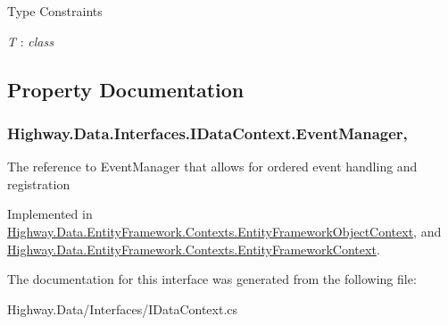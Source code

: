 \begin{Desc}
\item[Type Constraints]\begin{description}
\item[{\em T} : {\em class}]\end{description}
\end{Desc}


\subsection{Property Documentation}
\hypertarget{interface_highway_1_1_data_1_1_interfaces_1_1_i_data_context_a66d20c659a7c50d08705534ad750e1f8}{
\subsubsection[{Event\-Manager}]{ Highway.\-Data.\-Interfaces.\-I\-Data\-Context.\-Event\-Manager\hspace{0.3cm}{\ttfamily [get]}, {\ttfamily [set]}}}\label{interface_highway_1_1_data_1_1_interfaces_1_1_i_data_context_a66d20c659a7c50d08705534ad750e1f8}


The reference to Event\-Manager that allows for ordered event handling and registration 



Implemented in \hyperlink{class_highway_1_1_data_1_1_entity_framework_1_1_contexts_1_1_entity_framework_object_context_a2342a28fa33d6cae0ce58c5f74438e9a}{Highway.\-Data.\-Entity\-Framework.\-Contexts.\-Entity\-Framework\-Object\-Context}, and \hyperlink{class_highway_1_1_data_1_1_entity_framework_1_1_contexts_1_1_entity_framework_context_aefd1b923c2414387cddd0a579608039d}{Highway.\-Data.\-Entity\-Framework.\-Contexts.\-Entity\-Framework\-Context}.



The documentation for this interface was generated from the following file\-:\begin{DoxyCompactItemize}
\item 
Highway.\-Data/\-Interfaces/I\-Data\-Context.\-cs\end{DoxyCompactItemize}
